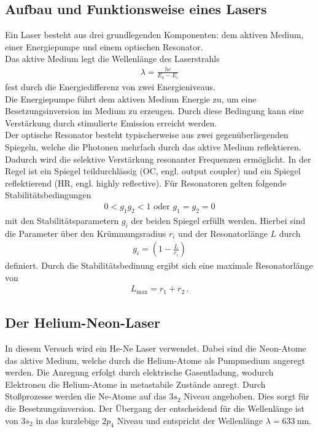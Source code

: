 \subsection{Aufbau und Funktionsweise eines Lasers}
Ein Laser besteht aus drei grundlegenden Komponenten: dem aktiven Medium, einer Energiepumpe und einem optischen Resonator.\\
Das aktive Medium legt die Wellenlänge des Laserstrahls
\begin{align}
    \lambda = \frac{h c}{E_k - E_i} \label{eqn:Wellenlange}
\end{align} 
fest durch die Energiedifferenz von zwei Energieniveaus.\\
Die Energiepumpe führt dem aktiven Medium Energie zu, um eine Besetzungsinversion im Medium zu erzeugen. Durch diese Bedingung kann eine Verstärkung durch stimulierte Emission erreicht werden.\\
Der optische Resonator besteht typischerweise aus zwei gegenüberliegenden Spiegeln, welche die Photonen mehrfach durch das aktive Medium reflektieren.
Dadurch wird die selektive Verstärkung resonanter Frequenzen ermöglicht. In der Regel ist ein Spiegel teildurchlässig (OC, engl. output coupler) und ein Spiegel reflektierend (HR, engl. highly reflective).
Für Resonatoren gelten folgende Stabilitätsbedingungen 
\begin{align}
    0 < g_1 g_2 < 1\text{ oder } g_1 = g_2 = 0 \label{eqn:Stabilitaetsbedingung}
\end{align}
mit den Stabilitätsparametern $g_i$ der beiden Spiegel erfüllt werden. Hierbei sind die Parameter über den Krümmungsradius $r_i$ und der Resonatorlänge $L$ durch
\begin{align}
    g_i = \left(1- \frac{L}{r_i}\right)\label{eqn:stabilitaetsparameter}
\end{align}
definiert. 
Durch die Stabilitätsbedinung ergibt sich eine maximale Resonatorlänge von
\begin{align}
    L_{\text{max}} = r_1 + r_2\,.\label{eqn:maximaleResonatorlaenge}
\end{align}
\cite{laserspektroskopie}

\subsection{Der Helium-Neon-Laser}
In diesem Versuch wird ein He-Ne Laser verwendet. Dabei sind die Neon-Atome das aktive Medium, welche durch die Helium-Atome als Pumpmedium angeregt werden. 
Die Anregung erfolgt durch elektrische Gasentladung, wodurch Elektronen die Helium-Atome in metastabile Zustände anregt. Durch Stoßprozesse werden die Ne-Atome auf das $3s_2$ Niveau angehoben. 
Dies sorgt für die Besetzungsinversion. 
Der Übergang der entscheidend für die Wellenlänge ist von $3s_2$ in das kurzlebige $2p_4$ Niveau und entspricht der Wellenlänge $\lambda = \SI{633}{\nano\meter}$. \cite{laser} \cite{leifiLaser}

